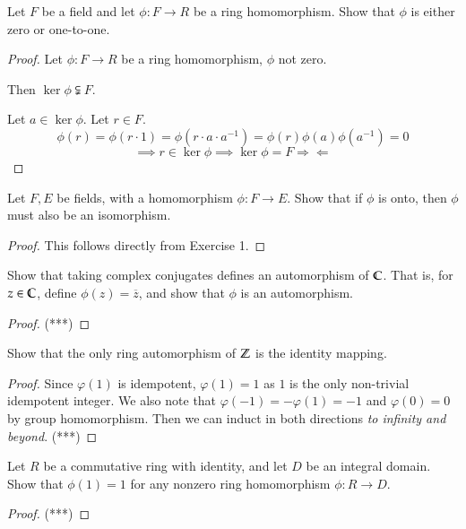 \exercise Let $F$ be a field and let $\phi:F\to R$ be a ring homomorphism. Show that $\phi$ is either zero or one-to-one. 
\begin{proof}
	Let $\phi:F\to R$ be a ring homomorphism, $\phi$ not zero. 
	
	Then $\ker\phi\subsetneqq F$. 
	
	Let $a\in \ker \phi$. Let $r\in F$. 
	\[\phi(r) = \phi(r \cdot 1) = \phi(r\cdot a\cdot a^{-1}) = \phi(r)\phi(a)\phi(a^{-1}) = 0\]
	\[\implies r\in \ker\phi\implies \ker\phi = F \Rightarrow\!\Leftarrow\]
\end{proof}

\exercise Let $F, E$ be fields, with a homomorphism $\phi: F\to E$. Show that if $\phi$ is onto, then $\phi$ must also be an isomorphism. 

\begin{proof}
	This follows directly from Exercise 1. 
\end{proof}


\exercise Show that taking complex conjugates defines an automorphism of $\mathbb{C}$. That is, for $z\in \mathbb{C}$, define $\phi(z) = \overline{z}$, and show that $\phi$ is an automorphism. 
\begin{proof}
	(***)
\end{proof}

\exercise Show that the only ring automorphism of $\mathbb{Z}$ is the identity mapping. 
\begin{proof}
	Since $\varphi(1)$ is idempotent, $\varphi(1) = 1$ as $1$ is the only non-trivial idempotent integer. We also note that $\varphi(-1) = -\varphi(1) = -1$ and $\varphi(0) = 0$ by group homomorphism. Then we can induct in both directions \textit{to infinity and beyond}. (***)
\end{proof}

\exercise Let $R$ be a commutative ring with identity, and let $D$ be an integral domain. Show that $\phi(1) = 1$ for any nonzero ring homomorphism $\phi:R\to D$. 
\begin{proof}
	(***)
\end{proof}

